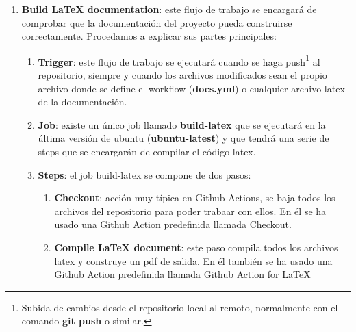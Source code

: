     \begin{enumerate}
        \item \textbf{\href{https://github.com/alexespana/TFG/actions/workflows/docs.yml}
        {Build LaTeX documentation}}: este flujo de trabajo se encargará de comprobar que
        la documentación del proyecto pueda construirse correctamente. Procedamos a
        explicar sus partes principales:
            \begin{enumerate}
                \item \textbf{Trigger}: este flujo de trabajo se ejecutará cuando se haga
                push\footnote{Subida de cambios desde el repositorio local al remoto,
                normalmente con el comando \textbf{git push} o similar.} al repositorio,
                siempre y cuando los archivos modificados sean el propio archivo
                donde se define el workflow (\textbf{docs.yml}) o cualquier archivo latex de
                la documentación.
                \item \textbf{Job}: existe un único job llamado \textbf{build-latex} que se
                ejecutará en la última versión de ubuntu (\textbf{ubuntu-latest}) y que
                tendrá una serie de steps que se encargarán de compilar el código latex.
                \item \textbf{Steps}: el job build-latex se compone de dos pasos:
                    \begin{enumerate}
                        \item \textbf{Checkout}: acción muy típica en Github Actions, se baja
                        todos los archivos del repositorio para poder trabaar con ellos. En
                        él se ha usado una Github Action predefinida llamada
                        \href{https://github.com/marketplace/actions/checkout}{Checkout}.
                        \item \textbf{Compile LaTeX document}: este paso compila todos los
                        archivos latex y construye un pdf de salida. En él también se ha
                        usado una Github Action predefinida llamada
                        \href{https://github.com/marketplace/actions/github-action-for-latex}
                        {Github Action for LaTeX}
                    \end{enumerate}
            \end{enumerate}


\end{enumerate}

